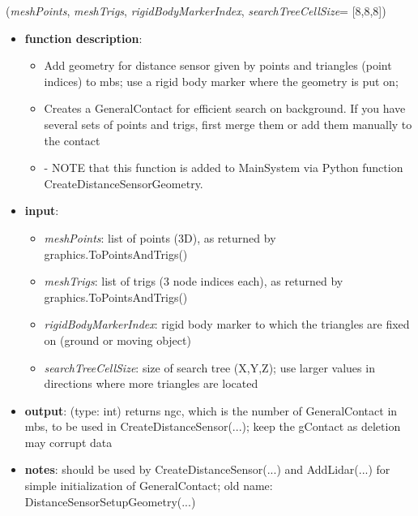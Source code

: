 \ei

%
\begin{flushleft}
\label{sec:mainsystemextensions:CreateDistanceSensorGeometry}
({\it meshPoints}, {\it meshTrigs}, {\it rigidBodyMarkerIndex}, {\it searchTreeCellSize}= [8,8,8])
\end{flushleft}
\setlength{\itemindent}{0.7cm}
\begin{itemize}[leftmargin=0.7cm]
\item[--]
{\bf function description}: \vspace{-6pt}
\begin{itemize}[leftmargin=1.2cm]
\setlength{\itemindent}{-0.7cm}
\item[]Add geometry for distance sensor given by points and triangles (point indices) to mbs; use a rigid body marker where the geometry is put on;
\item[]Creates a GeneralContact for efficient search on background. If you have several sets of points and trigs, first merge them or add them manually to the contact
\item[]- NOTE that this function is added to MainSystem via Python function CreateDistanceSensorGeometry.
\end{itemize}
\item[--]
{\bf input}: \vspace{-6pt}
\begin{itemize}[leftmargin=1.2cm]
\setlength{\itemindent}{-0.7cm}
\item[]{\it meshPoints}: list of points (3D), as returned by graphics.ToPointsAndTrigs()
\item[]{\it meshTrigs}: list of trigs (3 node indices each), as returned by graphics.ToPointsAndTrigs()
\item[]{\it rigidBodyMarkerIndex}: rigid body marker to which the triangles are fixed on (ground or moving object)
\item[]{\it searchTreeCellSize}: size of search tree (X,Y,Z); use larger values in directions where more triangles are located
\end{itemize}
\item[--]
{\bf output}: (type: int) returns ngc, which is the number of GeneralContact in mbs, to be used in CreateDistanceSensor(...); keep the gContact as deletion may corrupt data
\item[--]
{\bf notes}: should be used by CreateDistanceSensor(...) and AddLidar(...) for simple initialization of GeneralContact; old name: DistanceSensorSetupGeometry(...)
\vspace{12pt}\end{itemize}
%

